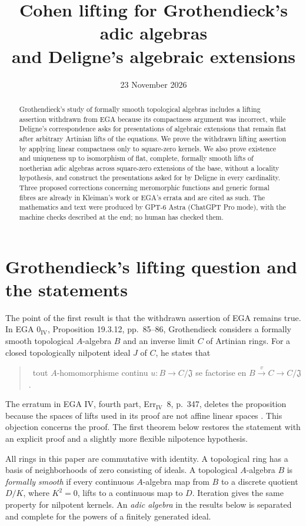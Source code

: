 \documentclass[11pt]{article}
\title{Cohen lifting for Grothendieck's adic algebras\\and Deligne's algebraic extensions}
\author{}
\date{23 November 2026}
\theoremstyle{definition}\newtheorem{definition}[theorem]{Definition}
\theoremstyle{remark}\newtheorem{remark}[theorem]{Remark}
\begin{document}
\maketitle
\begin{abstract}
Grothendieck's study of formally smooth topological algebras includes a lifting assertion withdrawn from EGA because its compactness argument was incorrect, while Deligne's correspondence asks for presentations of algebraic extensions that remain flat after arbitrary Artinian lifts of the equations. We prove the withdrawn lifting assertion by applying linear compactness only to square-zero kernels. We also prove existence and uniqueness up to isomorphism of flat, complete, formally smooth lifts of noetherian adic algebras across square-zero extensions of the base, without a locality hypothesis, and construct the presentations asked for by Deligne in every cardinality. Three proposed corrections concerning meromorphic functions and generic formal fibres are already in Kleiman's work or EGA's errata and are cited as such. The mathematics and text were produced by GPT-6 Astra (ChatGPT Pro mode), with the machine checks described at the end; no human has checked them.
\end{abstract}

\section{Grothendieck's lifting question and the statements}

The point of the first result is that the withdrawn assertion of EGA remains true. In EGA $0_{\mathrm{IV}}$, Proposition 19.3.12, pp.~85--86, Grothendieck considers a formally smooth topological $A$-algebra $B$ and an inverse limit $C$ of Artinian rings. For a closed topologically nilpotent ideal $J$ of $C$, he states that
\begin{quote}
\guillemotleft\ tout $A$-homomorphisme continu $u:B\to C/\mathfrak J$ se factorise en $B\xrightarrow{v}C\to C/\mathfrak J$\guillemotright.
\end{quote}
The erratum in EGA IV, fourth part, Err$_{\mathrm{IV}}$~8, p.~347, deletes the proposition because the spaces of lifts used in its proof are not affine linear spaces \cite{EGAIV1,EGAIV4}. This objection concerns the proof. The first theorem below restores the statement with an explicit proof and a slightly more flexible nilpotence hypothesis.

All rings in this paper are commutative with identity. A topological ring has a basis of neighborhoods of zero consisting of ideals. A topological $A$-algebra $B$ is \emph{formally smooth} if every continuous $A$-algebra map from $B$ to a discrete quotient $D/K$, where $K^2=0$, lifts to a continuous map to $D$. Iteration gives the same property for nilpotent kernels. An \emph{adic algebra} in the results below is separated and complete for the powers of a finitely generated ideal.
\end{document}
